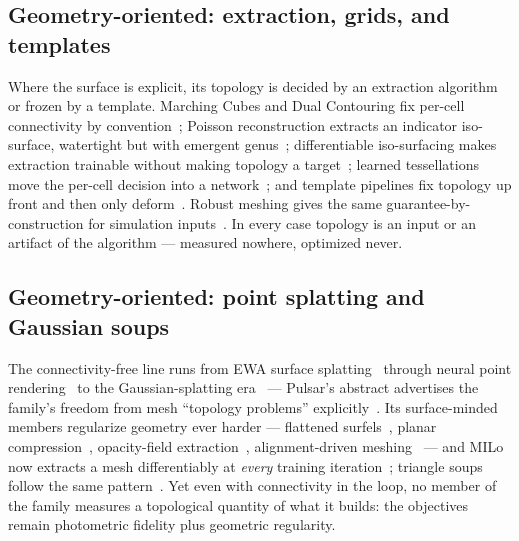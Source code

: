 \subsection{Geometry-oriented: extraction, grids, and templates}
Where the surface is explicit, its topology is decided by an extraction
algorithm or frozen by a template. Marching Cubes and Dual Contouring
fix per-cell connectivity by
convention~\citep{lorensen1987marching,ju2002dual}; Poisson
reconstruction extracts an indicator iso-surface, watertight but with
emergent genus~\citep{kazhdan2006poisson,kazhdan2013screened};
differentiable iso-surfacing makes extraction trainable without making
topology a
target~\citep{remelli2020meshsdf,gao2020deftet,shen2021dmtet,munkberg2022nvdiffrec,shen2023flexicubes};
learned tessellations move the per-cell decision into a
network~\citep{chen2021nmc,chen2020bspnet}; and template pipelines fix
topology up front and then only
deform~\citep{wang2018pixel2mesh,hanocka2020point2mesh,gkioxari2019meshrcnn}.
Robust meshing gives the same guarantee-by-construction for simulation
inputs~\citep{hu2018tetwild}. In every case topology is an input or an
artifact of the algorithm --- measured nowhere, optimized never.

\subsection{Geometry-oriented: point splatting and Gaussian soups}
The connectivity-free line runs from EWA surface
splatting~\citep{zwicker2001splatting} through neural point
rendering~\citep{aliev2020npbg,ruckert2022adop,xu2022pointnerf} to the
Gaussian-splatting era~\citep{kerbl2023gaussians,yu2024mipsplatting} ---
Pulsar's abstract advertises the family's freedom from mesh ``topology
problems'' explicitly~\citep{lassner2021pulsar}. Its surface-minded
members regularize geometry ever harder --- flattened
surfels~\citep{huang20242dgs,dai2024surfels}, planar
compression~\citep{chen2024pgsr}, opacity-field
extraction~\citep{yu2024gof}, alignment-driven
meshing~\citep{guedon2024sugar} --- and MILo now extracts a mesh
differentiably at \emph{every} training
iteration~\citep{guedon2025milo}; triangle soups follow the same
pattern~\citep{held2025trianglesplatting,burgdorfer2025radiant,tojo2026diffsoup}.
Yet even with connectivity in the loop, no member of the family
measures a topological quantity of what it builds: the objectives
remain photometric fidelity plus geometric regularity.

